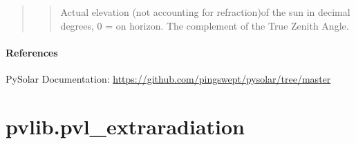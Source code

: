 \documentclass[letterpaper,10pt,english]{sphinxmanual}
\begin{document}
\begin{fulllineitems}
\begin{quote}
\begin{description}
\begin{quote}
Actual elevation (not accounting for refraction)of the sun 
in decimal degrees, 0 = on horizon. The complement of the True Zenith
Angle.
\end{quote}

\end{description}\end{quote}
\paragraph{References}

PySolar Documentation: \href{https://github.com/pingswept/pysolar/tree/master}{https://github.com/pingswept/pysolar/tree/master}

\end{fulllineitems}



\section{pvlib.pvl\_extraradiation}
\label{stubs/pvlib.pvl_extraradiation:pvlib-pvl-extraradiation}\label{stubs/pvlib.pvl_extraradiation::doc}
\end{document}
